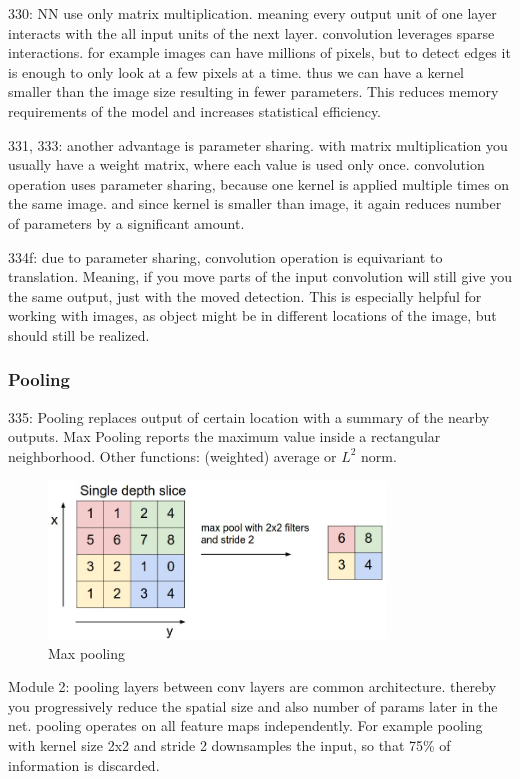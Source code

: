 \cite{DLbook16}
330: NN use only matrix multiplication. meaning every output unit of one layer interacts with the all input units of the next layer. convolution leverages sparse interactions. for example images can have millions of pixels, but to detect edges it is enough to only look at a few pixels at a time. thus we can have a kernel smaller than the image size resulting in fewer parameters. This reduces memory requirements of the model and increases statistical efficiency.

331, 333: another advantage is parameter sharing. with matrix multiplication you usually have a weight matrix, where each value is used only once. convolution operation uses parameter sharing, because one kernel is applied multiple times on the same image. and since kernel is smaller than image, it again reduces number of parameters by a significant amount.

334f: due to parameter sharing, convolution operation is equivariant to translation. Meaning, if you move parts of the input convolution will still give you the same output, just with the moved detection. This is especially helpful for working with images, as object might be in different locations of the image, but should still be realized.

\subsubsection{Pooling}
\cite{DLbook16}
335: Pooling replaces output of certain location with a summary of the nearby outputs. Max Pooling reports the maximum value inside a rectangular neighborhood. Other functions: (weighted) average or $L^2$ norm.


\begin{figure}[h]
    \centering
    \includegraphics[width=0.8\textwidth]{images/maxpool}
    \caption{Max pooling \cite{stanford_convnet}}
    \label{fig:pooling}
\end{figure}

\cite{stanford_convnet}
Module 2: pooling layers between conv layers are common architecture. thereby you progressively reduce the spatial size and also number of params later in the net. pooling operates on all feature maps independently. For example pooling with kernel size 2x2 and stride 2 downsamples the input, so that 75\% of information is discarded.

